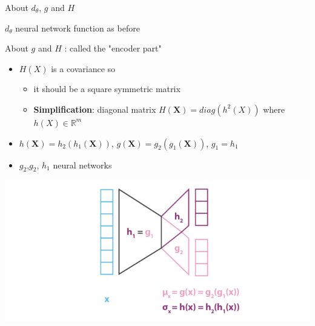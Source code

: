 \documentclass[compress,10pt]{beamer}
\begin{document}
\begin{frame}[fragile]{About $d_\theta$, $g$ and $H$}
  
$d_\theta$ neural network function as before   

About $g$ and $H$ : called the "encoder part"
 
\begin{itemize}
\item    $H(X)$ is a covariance so
\begin{itemize}
\item  it should be a square symmetric matrix
\item  \textbf{Simplification}: diagonal matrix $H(\mathbf{X}) = diag(h^2(X))$ where  $h(X) \in \mathbb{R}^m$
\end{itemize}
\item
  \(h(\mathbf{X}) = h_2(h_1(\mathbf{X}))\), \(g(\mathbf{X}) = g_2(g_1(\mathbf{X}))\), \(g_1 = h_1\)
  \item $g_2$,$g_2$, $h_1$ neural networks 
\end{itemize}

\begin{center}\includegraphics[width=0.7\linewidth]{images/approxZ} \end{center}

\end{frame}
\end{document}
